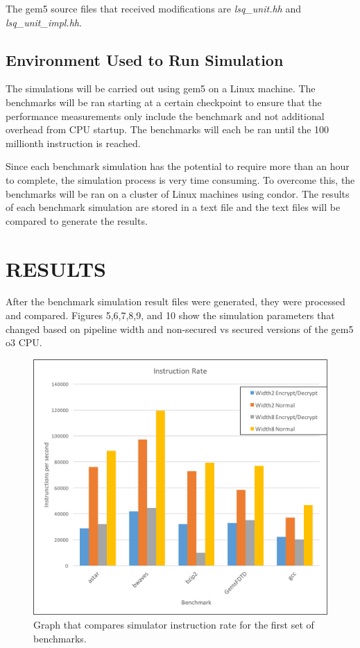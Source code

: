 \documentclass[letterpaper, 10pt, conference]{ieeeconf}  %
\begin{document}
The gem5 source files that received modifications are \emph{lsq\_unit.hh} and \emph{lsq\_unit\_impl.hh}.
  

\subsection{Environment Used to Run Simulation}

The simulations will be carried out using gem5 on a Linux machine.  The benchmarks will be ran starting at a certain checkpoint to ensure that the performance measurements only include the benchmark and not additional overhead from CPU startup.  The benchmarks will each be ran  until the 100 millionth instruction is reached.

Since each benchmark simulation has the potential to require more than an hour to complete, the simulation process is very time consuming.  To overcome this, the benchmarks will be ran on a cluster of Linux machines using condor.  The results of each benchmark simulation are stored in a text file and the text files will be compared to generate the results.   

\section{RESULTS}

After the benchmark simulation result files were generated, they were processed and compared.  Figures 5,6,7,8,9, and 10 show the simulation parameters that changed based on pipeline width and non-secured vs secured versions of the gem5 o3 CPU.

\begin{figure}[thpb]
	\centering
	\includegraphics[scale=.45]{InstructionRate1}
   \caption{Graph that compares simulator instruction rate for the first set of benchmarks.}
\end{figure}
\end{document}
